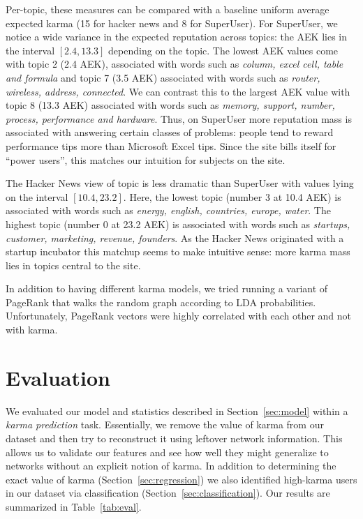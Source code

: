 \documentclass[11pt]{article}
\begin{document}
Per-topic, these measures can be compared with a baseline uniform average
expected karma (15 for hacker news and 8 for SuperUser). For SuperUser, we
notice a wide variance in the expected reputation across topics: the AEK lies in
the interval $[2.4, 13.3]$ depending on the topic. The lowest AEK values come
with topic 2 (2.4 AEK), associated with words such as \textit{column, excel cell, table
and formula} and topic 7 (3.5 AEK) associated with words such as \textit{router,
wireless, address, connected}. We can contrast this to the largest AEK value with topic 8
(13.3 AEK) associated with words such as \textit{memory, support, number,
process, performance and hardware}. Thus, on SuperUser more reputation mass is
associated with answering certain classes of problems: people tend to reward 
performance tips more than Microsoft Excel tips. Since the site bills itself for
``power users'', this matches our intuition for subjects on the site.

The Hacker News view of topic is less dramatic than SuperUser with values lying
on the interval $[10.4, 23.2]$. Here, the lowest topic (number 3 at 10.4
AEK) is associated with words such as \textit{energy, english, countries,
europe, water}. The highest topic (number 0 at 23.2 AEK) is associated with
words such as \textit{startups, customer, marketing, revenue, founders}. As
the Hacker News originated with a startup incubator this matchup seems to make
intuitive sense: more karma mass lies in topics central to the site.

In addition to having different karma models, we tried running a variant of
PageRank that walks the random graph according to LDA probabilities.
Unfortunately, PageRank vectors were highly correlated with each other and not
with karma.

\section{Evaluation}
\label{sec:eval}
We evaluated our model and statistics described in Section~\ref{sec:model}
within a \textit{karma prediction} task. Essentially, we remove the value of
karma from our dataset and then try to reconstruct it using leftover network
information. This allows us to validate our features and see how well they might
generalize to networks without an explicit notion of karma. In addition to 
determining the exact value of karma
(Section~\ref{sec:regression}) we also identified high-karma users in our
dataset via classification (Section~\ref{sec:classification}). Our results are
summarized in Table~\ref{tab:eval}.
\end{document}
